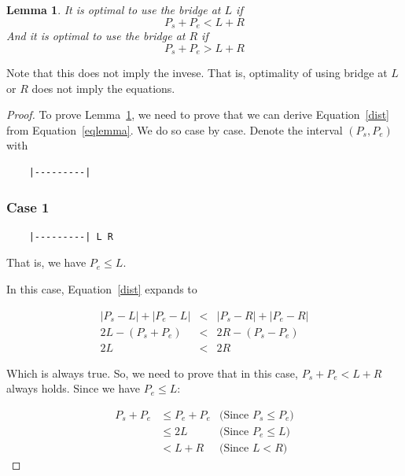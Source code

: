\documentclass[a4paper]{article}
\newtheorem{lemma}{Lemma}[subsection]
\begin{document}
\begin{lemma}
	\label{lem}
	It is optimal to use the bridge at $L$ if
	\begin{equation}
	\label{eqlemma}
	P_s + P_e < L+R
	\end{equation}
	And it is optimal to use the bridge at $R$ if
	\begin{equation}
	\label{eqlemma}
	P_s + P_e > L+R
	\end{equation}
\end{lemma}

Note that this does not imply the invese. That is, optimality of using bridge
at $L$ or $R$ does not imply the equations.

\begin{proof}
	
	To prove Lemma~\ref{lem}, we need to prove that we can derive
	Equation~\ref{dist} from Equation~\ref{eqlemma}. We do so case by case.
	Denote the interval $(P_s, P_e)$ with
	
	\begin{verbatim}
	|---------|
	\end{verbatim}
	
	\subsubsection*{Case 1}
	
	\begin{verbatim}
	|---------| L R
	\end{verbatim}
	
	That is, we have $P_e \le L$.
	
	In this case, Equation~\ref{dist} expands to
	
	\begin{eqnarray*}
		|P_s - L| + |P_e - L| &<& |P_s - R| + |P_e - R| \\
		2L - (P_s + P_e) &<& 2R - (P_s - P_e) \\
		2L &<& 2R
	\end{eqnarray*}
	
	Which is always true. So, we need to prove that in this case,
	$P_s + P_e < L+R$ always holds. Since we have $P_e \le L$:
	
	\begin{eqnarray*}
		P_s + P_e &\le P_e + P_e & \text{(Since $P_s \le P_e$)} \\
		&\le 2L & \text{(Since $P_e \le L$)} \\
		&< L + R & \text{(Since $L < R$)}
	\end{eqnarray*}
	

\end{proof}
\end{document}
